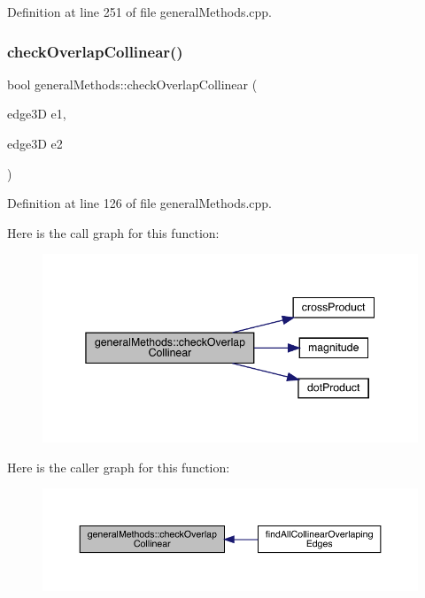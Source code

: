 Definition at line 251 of file general\+Methods.\+cpp.

\mbox{\label{namespacegeneral_methods_aa7662b2bcff30f8983da23da5edfc766}} 
\subsubsection{\texorpdfstring{check\+Overlap\+Collinear()}{checkOverlapCollinear()}}
{\footnotesize\ttfamily bool general\+Methods\+::check\+Overlap\+Collinear (\begin{DoxyParamCaption}\item[{edge3D}]{e1,  }\item[{edge3D}]{e2 }\end{DoxyParamCaption})}



Definition at line 126 of file general\+Methods.\+cpp.

Here is the call graph for this function\+:
\nopagebreak
\begin{figure}[H]
\begin{center}
\leavevmode
\includegraphics[width=345pt]{namespacegeneral_methods_aa7662b2bcff30f8983da23da5edfc766_cgraph}
\end{center}
\end{figure}
Here is the caller graph for this function\+:
\nopagebreak
\begin{figure}[H]
\begin{center}
\leavevmode
\includegraphics[width=350pt]{namespacegeneral_methods_aa7662b2bcff30f8983da23da5edfc766_icgraph}
\end{center}
\end{figure}
\mbox{\label{namespacegeneral_methods_afc8f20af710f8dc24af591015acc1403}} 
